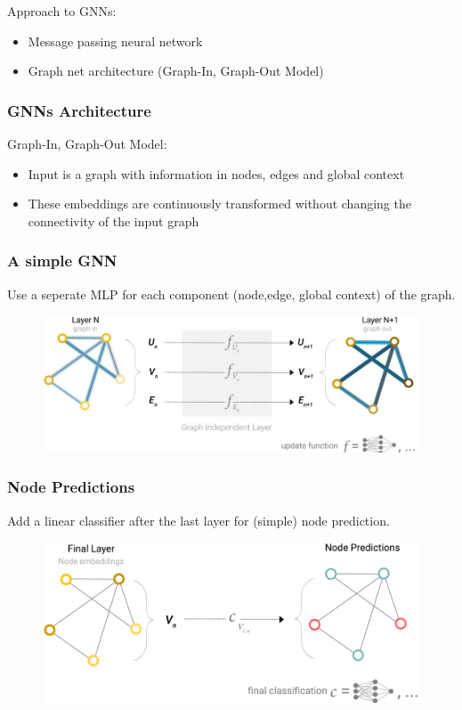 Approach to GNNs:
\begin{itemize}
    \item Message passing neural network
    \item Graph net architecture (Graph-In, Graph-Out Model)
\end{itemize}

\subsubsection{GNNs Architecture}
Graph-In, Graph-Out Model:
\begin{itemize}
    \item Input is a graph with information in nodes, edges and global context
    \item These embeddings are continuously transformed without changing the connectivity of the input graph
\end{itemize}

\subsubsection*{A simple GNN}
Use a seperate MLP for each component (node,edge, global context) of the graph.
\begin{figure}[!h]
    \includegraphics[width = \columnwidth]{figures/GraphNeuralNetworks1/SimpleGNN.png}
\end{figure}

\subsubsection*{Node Predictions}
Add a linear classifier after the last layer for (simple) node prediction.

\begin{figure}[!h]
    \includegraphics[width = \columnwidth]{figures/GraphNeuralNetworks1/NodePredictions.png}
\end{figure}

